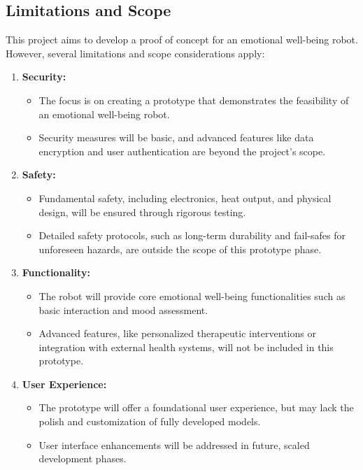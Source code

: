 \subsection{Limitations and Scope}
This project aims to develop a proof of concept for an emotional well-being robot. However, several limitations and scope considerations apply:
\begin{enumerate}
    \item\textbf{Security:}
        \begin{itemize}
            \item The focus is on creating a prototype that demonstrates the feasibility of an emotional well-being robot.
            \item Security measures will be basic, and advanced features like data encryption and user authentication are beyond the project’s scope.
        \end{itemize}
    \item\textbf{Safety:}
        \begin{itemize}
            \item Fundamental safety, including electronics, heat output, and physical design, will be ensured through rigorous testing.
            \item Detailed safety protocols, such as long-term durability and fail-safes for unforeseen hazards, are outside the scope of this prototype phase.
        \end{itemize}
    \item\textbf{Functionality:}
        \begin{itemize}
            \item The robot will provide core emotional well-being functionalities such as basic interaction and mood assessment.
            \item Advanced features, like personalized therapeutic interventions or integration with external health systems, will not be included in this prototype.
        \end{itemize}
    \item\textbf{User Experience:}
        \begin{itemize}
            \item The prototype will offer a foundational user experience, but may lack the polish and customization of fully developed models.
            \item User interface enhancements will be addressed in future, scaled development phases.
        \end{itemize}

\end{enumerate}
